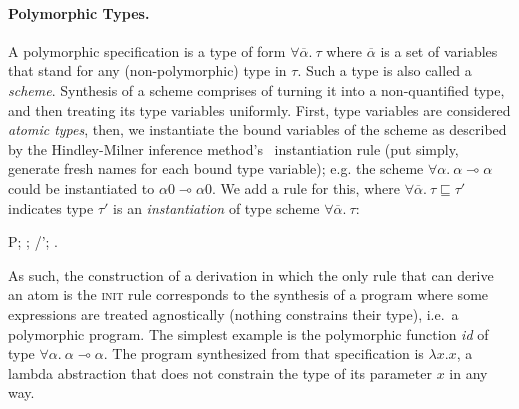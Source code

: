 \documentclass{llncs}
\newcommand{\lolli}{\multimap}
\newcommand{\mypara}[1]{\paragraph{\textbf{#1}.}}
\def\Rho{P}
\begin{document}
\mypara{Polymorphic Types} A polymorphic specification is a type of form
$\forall \overline{\alpha}.\ \tau$ where $\overline{\alpha}$ is a set of
variables that stand for any (non-polymorphic) type in $\tau$. Such a type is
also called a \emph{scheme}.  Synthesis of a scheme comprises of turning it into
a non-quantified type, and then treating its type variables uniformly.  First,
type variables are considered \emph{atomic types}, then, we instantiate the
bound variables of the scheme as described by the Hindley-Milner inference
method's~\cite{DBLP:journals/jcss/Milner78,10.2307/1995158} instantiation rule (put simply, generate fresh names
for each bound type variable); e.g. the scheme $\forall \alpha.\ \alpha \lolli
\alpha$ could be instantiated to $\alpha0 \lolli \alpha0$. We add a rule for
this, where $\forall \overline{\alpha}.\ \tau \sqsubseteq \tau'$ indicates type
$\tau'$ is an \emph{instantiation} of type scheme $\forall \overline{\alpha}.\
\tau$:
%
\begin{mathpar}
    \infer*[right=($\forall R$)]
    { \Rho; \Gamma; \Delta/\Delta'; \Omega \vdash \tau' \Uparrow \and \forall
    \overline{\alpha}.\ \tau
    \sqsubseteq \tau'}
    {\Rho; \Gamma; \Delta/\Delta'; \Omega \vdash \forall \overline{\alpha}.\
    \tau \Uparrow}
\end{mathpar}
%
As such, the construction of a derivation in which the only rule that can derive
an atom is the \textsc{init} rule corresponds to the synthesis of a program
where some expressions are treated agnostically (nothing constrains their type),
i.e.~a polymorphic program. The simplest example is the polymorphic function
\emph{id} of type $\forall \alpha .\ \alpha \lolli \alpha$. The program
synthesized from that specification is $\lambda x . x$, a lambda abstraction
that does not constrain the type of its parameter $x$ in any way.
\end{document}
